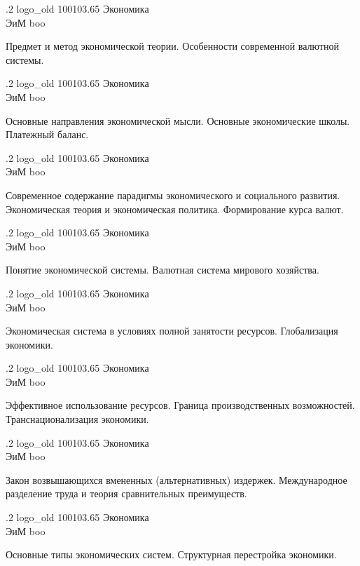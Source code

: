 \documentclass[
	12pt,
	a4paper,
	]
	{article}
\newcommand{\shapkFull}{
	\shapk
		{.2}
		{logo_old}
		{100103.65}
		{Экономика\\}
		{ЭиМ}
		{boo}
}
\begin{document}
\shapkFull
\setcounter{zad}{0}

\z 	Предмет и метод экономической теории.
 \medskip
\z 	Особенности современной валютной системы. \medskip

\newpage


\shapkFull
\setcounter{zad}{0}

\z 	Основные направления экономической мысли. Основные экономические школы.
 \medskip
\z 	Платежный баланс.
 \medskip

\newpage


\shapkFull
\setcounter{zad}{0}

\z 	Современное содержание парадигмы экономического и социального развития. Экономическая теория и экономическая политика.
 \medskip
\z 	Формирование курса валют.
 \medskip

\newpage


\shapkFull
\setcounter{zad}{0}

\z 	Понятие экономической системы.  
 \medskip
\z 	Валютная система мирового хозяйства.
 \medskip

\newpage


\shapkFull
\setcounter{zad}{0}

\z 	Экономическая система в условиях полной занятости ресурсов.
 \medskip
\z 	Глобализация экономики.
 \medskip

\newpage


\shapkFull
\setcounter{zad}{0}

\z 	Эффективное использование ресурсов.  Граница производственных возможностей.
 \medskip
\z 	Транснационализация экономики.
 \medskip

\newpage


\shapkFull
\setcounter{zad}{0}

\z 	Закон возвышающихся вмененных (альтернативных) издержек.
 \medskip
\z 	Международное разделение труда и теория сравнительных преимуществ.
 \medskip

\newpage


\shapkFull
\setcounter{zad}{0}

\z 	Основные типы экономических систем. 
 \medskip
\z 	Структурная перестройка экономики.
 \medskip
\end{document}
